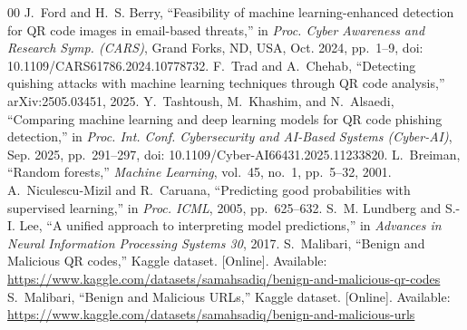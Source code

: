 \documentclass[conference]{IEEEtran}
\begin{document}
\begin{thebibliography}{00}
 J.~Ford and H.~S. Berry, ``Feasibility of machine learning-enhanced detection for QR code images in email-based threats,'' in \textit{Proc. Cyber Awareness and Research Symp. (CARS)}, Grand Forks, ND, USA, Oct. 2024, pp.~1--9, doi: 10.1109/CARS61786.2024.10778732.
 F.~Trad and A.~Chehab, ``Detecting quishing attacks with machine learning techniques through QR code analysis,'' arXiv:2505.03451, 2025.
 Y.~Tashtoush, M.~Khashim, and N.~Alsaedi, ``Comparing machine learning and deep learning models for QR code phishing detection,'' in \textit{Proc. Int. Conf. Cybersecurity and AI-Based Systems (Cyber-AI)}, Sep. 2025, pp.~291--297, doi: 10.1109/Cyber-AI66431.2025.11233820.
 L.~Breiman, ``Random forests,'' \textit{Machine Learning}, vol.~45, no.~1, pp.~5--32, 2001.
 A.~Niculescu-Mizil and R.~Caruana, ``Predicting good probabilities with supervised learning,'' in \textit{Proc. ICML}, 2005, pp.~625--632.
 S.~M. Lundberg and S.-I. Lee, ``A unified approach to interpreting model predictions,'' in \textit{Advances in Neural Information Processing Systems 30}, 2017.
 S.~Malibari, ``Benign and Malicious QR codes,'' Kaggle dataset. [Online]. Available: \url{https://www.kaggle.com/datasets/samahsadiq/benign-and-malicious-qr-codes}
 S.~Malibari, ``Benign and Malicious URLs,'' Kaggle dataset. [Online]. Available: \url{https://www.kaggle.com/datasets/samahsadiq/benign-and-malicious-urls}
\end{thebibliography}
\end{document}
